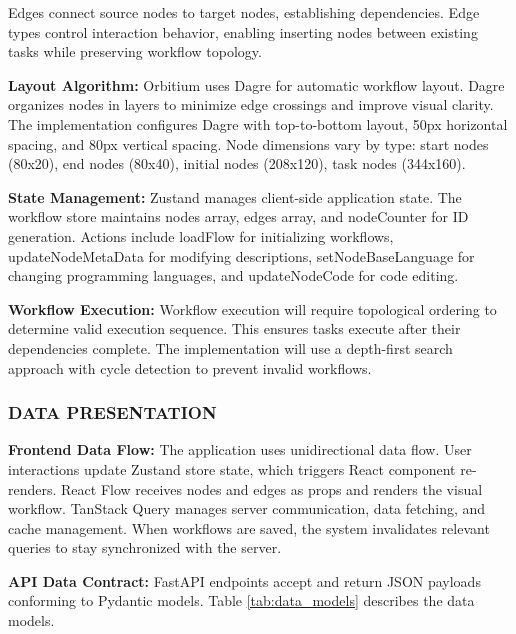 \documentclass[12pt]{article}
\begin{document}
Edges connect source nodes to target nodes, establishing dependencies. Edge types control interaction behavior, enabling inserting nodes between existing tasks while preserving workflow topology.

\textbf{Layout Algorithm:} Orbitium uses Dagre for automatic workflow layout. Dagre organizes nodes in layers to minimize edge crossings and improve visual clarity. The implementation configures Dagre with top-to-bottom layout, 50px horizontal spacing, and 80px vertical spacing. Node dimensions vary by type: start nodes (80x20), end nodes (80x40), initial nodes (208x120), task nodes (344x160).

\textbf{State Management:} Zustand manages client-side application state. The workflow store maintains nodes array, edges array, and nodeCounter for ID generation. Actions include loadFlow for initializing workflows, updateNodeMetaData for modifying descriptions, setNodeBaseLanguage for changing programming languages, and updateNodeCode for code editing.

\textbf{Workflow Execution:} Workflow execution will require topological ordering to determine valid execution sequence. This ensures tasks execute after their dependencies complete. The implementation will use a depth-first search approach with cycle detection to prevent invalid workflows.

\subsubsection{DATA PRESENTATION}

\textbf{Frontend Data Flow:} The application uses unidirectional data flow. User interactions update Zustand store state, which triggers React component re-renders. React Flow receives nodes and edges as props and renders the visual workflow. TanStack Query manages server communication, data fetching, and cache management. When workflows are saved, the system invalidates relevant queries to stay synchronized with the server.

\textbf{API Data Contract:} FastAPI endpoints accept and return JSON payloads conforming to Pydantic models. Table \ref{tab:data_models} describes the data models.
\end{document}
